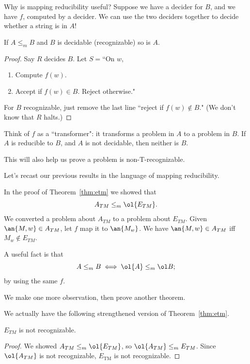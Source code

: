 Why is mapping reducibility useful? Suppose we have a decider for $B$, and we have $f$, computed by a decider. We can use the two deciders together to decide whether a string is in $A$!
\begin{pr}
If $A\le_mB$ and $B$ is decidable (recognizable) so is $A$. %
\end{pr}
\begin{proof}
Say $R$ decides $B$. Let $S=$``On $w$,
\begin{enumerate}
\item
Compute $f(w)$.
\item 
Accept if $f(w)\in B$. 
Reject otherwise."
\end{enumerate}
For $B$ recognizable, just remove the last line ``reject if $f(w)\nin B$." (We don't know that $R$ halts.)
\end{proof}
Think of $f$ as a ``transformer": it transforms a problem in $A$ to a problem in $B$. If $A$ is reducible to $B$, and $A$ is not decidable, then neither is $B$.

This will also help us prove a problem is non-T-recognizable.

Let's recast our previous results in the language of mapping reducibility.

In the proof of Theorem~\ref{thm:etm} we showed that
\[
A_{TM}\le_m \ol{E_{TM}}.
\]
We converted a problem about $A_{TM}$ to a problem about $E_{TM}$. Given $\an{M,w}\in A_{TM}$, let $f$ map it to $\an{M_w}$. We have $\an{M,w}\in A_{TM}$ iff $M_w\nin E_{TM}$.




A useful fact is that
\[
A\le_mB\iff \ol{A}\le_m \ol B;
\]
by using the same $f$.

We make one more observation, then prove another theorem.

We actually have the following strengthened version of Theorem~\ref{thm:etm}.
\begin{thm}
$E_{TM}$ is not recognizable.
\end{thm}
\begin{proof}
We showed $A_{TM}\le_m\ol{E_{TM}}$, so $\ol{A_{TM}}\le_m E_{TM}$. Since $\ol{A_{TM}}$ is not recognizable, $E_{\text{TM}}$ is not recognizable. %
\end{proof}

